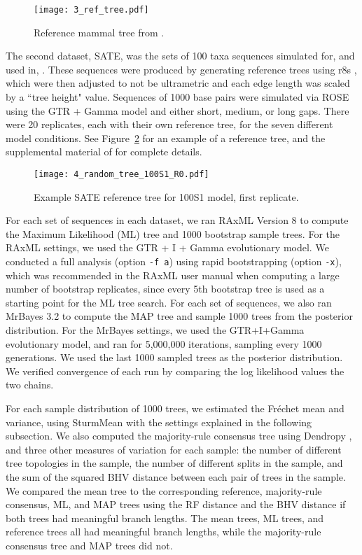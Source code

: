 \documentclass[12pt,letterpaper]{article}
\theoremstyle{plain}
\theoremstyle{definition}
\begin{document}
\begin{figure}[htb]
    \centering
    \texttt{[image: 3\_ref\_tree.pdf]}
    \caption{Reference mammal tree from \citet{Murphy01}.}
    \label{f:orig_tree}
\end{figure}

The second dataset, SATE, was the sets of 100 taxa sequences simulated for, and used in, \citet{sate}.  These sequences were produced by generating reference trees using r8s \citep{r8s}, which were then adjusted to not be ultrametric and each edge length was scaled by a ``tree height" value.  Sequences of 1000 base pairs were simulated via ROSE \citep{rose} using the GTR + Gamma model and either short, medium, or long gaps.  There were 20 replicates, each with their own reference tree, for the seven different model conditions.  See Figure~\ref{f:sate_ref_tree} for an example of a reference tree, and the supplemental material of \citet{sate} for complete details.

\begin{figure}[htb]
    \centering
    \texttt{[image: 4\_random\_tree\_100S1\_R0.pdf]}
    \caption{Example SATE reference tree for 100S1 model, first replicate.}
    \label{f:sate_ref_tree}
\end{figure}

For each set of sequences in each dataset, we ran RAxML Version 8 \citep{raxml_v8} to compute the Maximum Likelihood (ML) tree and 1000 bootstrap sample trees. For the RAxML settings, we used the GTR + I + Gamma evolutionary model.  We conducted a full analysis (option \verb+-f a+) using rapid bootstrapping (option \verb+-x+), which was recommended in the RAxML user manual %
when computing a large number of bootstrap replicates, since every 5th bootstrap tree is used as a starting point for the ML tree search.
For each set of sequences, we also ran MrBayes 3.2 \citep{mrbayes} to compute the MAP tree and sample 1000 trees from the posterior distribution.  For the MrBayes settings, we used the GTR+I+Gamma evolutionary model, and ran for 5,000,000 iterations, sampling every 1000 generations. We used the last 1000 sampled trees as the posterior distribution.  We verified convergence of each run by comparing the log likelihood values the two chains.

For each sample distribution of 1000 trees, we estimated the Fr\'echet mean and variance, using SturmMean \citep{MillerOwenProvan2015} with the settings explained in the following subsection.  We also computed the majority-rule consensus tree using Dendropy \citep{dendropy}, and three other measures of variation for each sample: the number of different tree topologies in the sample, the number of different splits in the sample, and the sum of the squared BHV distance between each pair of trees in the sample.  We compared the mean tree to the corresponding reference, majority-rule consensus, ML, and MAP trees using the RF distance and the BHV distance if both trees had meaningful branch lengths.  The mean trees, ML trees, and reference trees all had meaningful branch lengths, while the majority-rule consensus tree and MAP trees did not.
\end{document}
